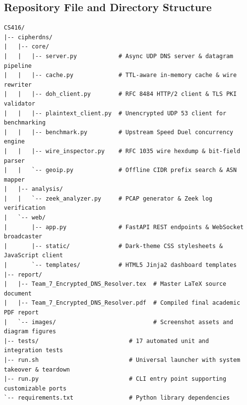 \documentclass[10pt,a4paper]{article}
\begin{document}
\subsection{Repository File and Directory Structure}
\begin{lstlisting}[style=codeblock, caption={cipherDNS Codebase Directory Structure}]
CS416/
|-- cipherdns/
|   |-- core/
|   |   |-- server.py            # Async UDP DNS server & datagram pipeline
|   |   |-- cache.py             # TTL-aware in-memory cache & wire rewriter
|   |   |-- doh_client.py        # RFC 8484 HTTP/2 client & TLS PKI validator
|   |   |-- plaintext_client.py  # Unencrypted UDP 53 client for benchmarking
|   |   |-- benchmark.py         # Upstream Speed Duel concurrency engine
|   |   |-- wire_inspector.py    # RFC 1035 wire hexdump & bit-field parser
|   |   `-- geoip.py             # Offline CIDR prefix search & ASN mapper
|   |-- analysis/
|   |   `-- zeek_analyzer.py     # PCAP generator & Zeek log verification
|   `-- web/
|       |-- app.py               # FastAPI REST endpoints & WebSocket broadcaster
|       |-- static/              # Dark-theme CSS stylesheets & JavaScript client
|       `-- templates/           # HTML5 Jinja2 dashboard templates
|-- report/
|   |-- Team_7_Encrypted_DNS_Resolver.tex  # Master LaTeX source document
|   |-- Team_7_Encrypted_DNS_Resolver.pdf  # Compiled final academic PDF report
|   `-- images/                            # Screenshot assets and diagram figures
|-- tests/                          # 17 automated unit and integration tests
|-- run.sh                          # Universal launcher with system takeover & teardown
|-- run.py                          # CLI entry point supporting customizable ports
`-- requirements.txt                # Python library dependencies
\end{lstlisting}
\end{document}
